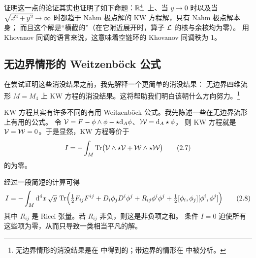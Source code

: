 证明这一点的论证其实也证明了如下命题：$\mathbb{R}^4_+$ 上、当 $y\to 0$ 时以及当
$\sqrt{\vec{x}^2+y^2}\to\infty$ 时都趋于 Nahm 极点解的 KW 方程解，只有 Nahm 极点解本身；
而且这个解是“横截的”（在它附近展开时，算子 $\mathcal{L}$ 的核与余核均为零）。
用 Khovanov 同调的语言来说，这意味着空链环的 Khovanov 同调秩为 1。


\subsection{无边界情形的 Weitzenböck 公式}

在尝试证明这些消没结果之前，我先解释一个更简单的消没结果：
无边界四维流形 $M=M_4$ 上 KW 方程的消没结果。这将帮助我们明白该朝什么方向努力。\footnote{无边界情形的消没结果是在 \cite{KW} 中得到的；带边界的情形在 \cite{MW} 中被分析。}


KW 方程其实有许多不同的有用 Weitzenböck 公式。我先陈述一些在无边界流形上有用的公式。
令 $\mathcal{V}=F-\phi\wedge\phi-\star\mathrm{d}_A\phi$、$\mathcal{W}=\mathrm{d}_A\star\phi$，
则 KW 方程就是 $\mathcal{V}=\mathcal{W}=0$。于是显然，KW 方程等价于
\begin{equation}\stepcounter{equation}
  I=-\int_M\Tr\bigl(\sV\wedge\star\sV+\sW\wedge\star\sW\bigr)
  \tag{2.7}\label{eq:2.7}
\end{equation}
的为零。


经过一段简短的计算可得
\begin{equation}\stepcounter{equation}
  I=-\int_M \mathrm{d}^4x\,\sqrt{g}\,\Tr\Bigl(
      \tfrac{1}{2}F_{ij}F^{ij}
      +D_i\phi_j D^{i}\phi^{j}
      +R_{ij}\phi^{i}\phi^{j}
      +\tfrac{1}{2}[\phi_i,\phi_j][\phi^{i},\phi^{j}]
    \Bigr)
  \tag{2.8}\label{eq:2.8}
\end{equation}
其中 $R_{ij}$ 是 Ricci 张量。若 $R_{ij}$ 非负，则这是非负项之和。
条件 $I=0$ 迫使所有这些项为零，从而只导致一类相当平凡的解。

